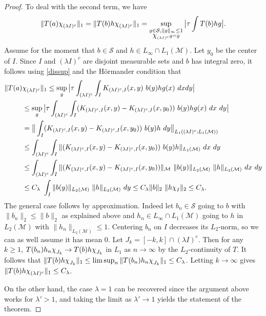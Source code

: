 \documentclass[psamsfonts]{amsart}
\newcommand*{\bigchi}{\mbox{\large$\chi$}}
\newcommand{\Lone}{L_1}
\newcommand{\Ltwo}{L_2}
\begin{document}
\begin{proof}
        To deal with the second term, we have
        $$ \|T(a)\bigchi_{(\lambda I)^c}\|_1 = \|T(b)h \bigchi_{(\lambda I)^c}\|_1 
        = \sup_{\substack{g \in \mathcal S,  \|g\|_{\infty} \leq 1 \\ \bigchi_{(\lambda I)^c}g=g}} \big| \tau \int T(b) h g \big|.$$
        Assume for the moment that $b\in \mathcal S$ and $h\in L_\infty \cap L_1(\mathcal M)$. Let $y_0$ be the center of $I$. Since $I$ and $(\lambda I)^c$ are disjoint measurable sets and $b$ has integral zero, it follows using \eqref{dissup} and the H\"ormander condition that
        \begin{align*}
            \|T(a)&\bigchi_{(\lambda I)^c}\|_1 \leq \sup_g \big| \tau \int_{(\lambda I)^c} \int_{I} K_{(\lambda I)^c,I}(x,y) \ b(y) h g(x) \ dx dy \big| \\
            &\leq \sup_g \big| \tau \int_{(\lambda I)^c} \int_{I} (K_{(\lambda I)^c,I}(x,y) - K_{(\lambda I)^c,I}(x,y_0)) \ b(y) h g(x) \ dx \ dy \big| \\
            &= \big\| \int_{I} (K_{(\lambda I)^c,I}(x,y) - K_{(\lambda I)^c,I}(x,y_0)) \ b(y)h \ dy \big\|_{\Lone((\lambda I)^c;\Lone(\mathcal{M}))} \\
            &\leq \int_{(\lambda I)^c} \int_I \| (K_{(\lambda I)^c,I}(x,y) - K_{(\lambda I)^c,I}(x,y_0)) \ b(y)h \|_{\Lone(\mathcal{M})} \ dx \ dy \\
            &\leq \int_{(\lambda I)^c} \int_I \| (K_{(\lambda I)^c,I}(x,y) - K_{(\lambda I)^c,I}(x,y_0)) \|_{\mathcal{M}} \ \|b(y)\|_{\Ltwo(\mathcal{M})} \ \|h\|_{\Ltwo(\mathcal{M})} \ dx \ dy \\
            &\leq C_\lambda \ \int_I \|b(y)\|_{\Ltwo(\mathcal{M})} \ \|h\|_{\Ltwo(\mathcal{M})} \ dy 
            \leq C_\lambda \|b\|_{2} \ \|h \bigchi_I\|_{2}
            \leq C_\lambda.
        \end{align*}
        The general case follows by approximation. Indeed let
        $b_n\in \mathcal S$ going to $b$ with $\|b_n\|_2\leq \|b\|_2$ as
        explained above and $ h_n\in L_\infty\cap \Lone(\mathcal M)$
        going to $h$ in $L_2(\mathcal M)$ with
        $\|h_n\|_{\Ltwo(\mathcal M)}\leq 1$. Centering $b_n$ on $I$
        decreases its $L_2$-norm, so we can as well assume it has mean
        0. Let $J_k=[-k,k]\cap(\lambda I)^c$. Then for any $k\geq 1$,
                $T(b_n)h_n\bigchi_{J_k}\to T(b)h \bigchi_{J_k}$ in $\Lone$ as
                $n\to \infty$ by the $L_2$-continuity of $T$. It follows that
              $\| T(b)h \bigchi_{J_k}\|_1\leq \limsup_n  \| T(b_n)h_n \bigchi_{J_k}\|_1\leq C_\lambda$. Letting $k\to \infty$ gives $\|T(b)h \bigchi_{(\lambda I)^c}\|_1 \leq C_\lambda$.

        On the other hand, the case $\lambda =1$ can be recovered since the argument above works for $\lambda' > 1$, and taking the limit as $\lambda' \rightarrow 1$ yields the statement of the theorem.
      
      \end{proof}
\end{document}

